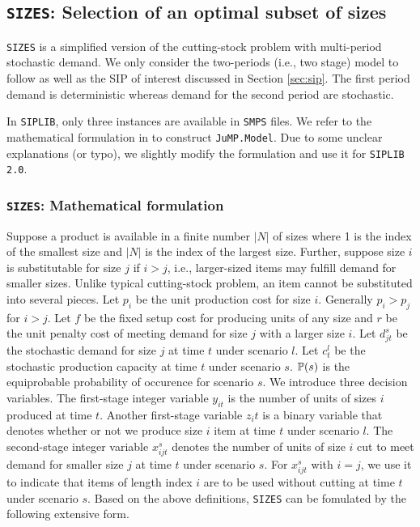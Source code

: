 \subsection{\texttt{SIZES}: Selection of an optimal subset of sizes} \label{SIZES}
\texttt{SIZES} is a simplified version of the cutting-stock problem with multi-period stochastic demand. We only consider the two-periods (i.e., two stage) model to follow \cite{journal:JSW1999} as well as the SIP of interest discussed in Section \ref{sec:sip}. The first period demand is deterministic whereas demand for the second period are stochastic. 

In \texttt{SIPLIB}, only three instances are available in \texttt{SMPS} files. We refer to the mathematical formulation in \cite{journal:JSW1999} to construct \texttt{JuMP.Model}. Due to some unclear explanations (or typo), we slightly modify the formulation and use it for \texttt{SIPLIB 2.0}.

\subsubsection{\texttt{SIZES}: Mathematical formulation}
Suppose a product is available in a finite number $|N|$ of sizes where 1 is the index of the smallest size and $|N|$ is the index of the largest size. Further, suppose size $i$ is substitutable for size $j$ if $i>j$, i.e., larger-sized items may fulfill demand for smaller sizes. Unlike typical cutting-stock problem, an item cannot be substituted into several pieces. 
Let $p_i$ be the unit production cost for size $i$. Generally $p_i>p_j$ for $i>j$. Let $f$ be the fixed setup cost for producing units of any size and $r$ be the unit penalty cost of meeting demand for size $j$ with a larger size $i$. Let $d_{jt}^s$ be the stochastic demand for size $j$ at time $t$ under scenario $l$. Let $c_t^l$ be the stochastic production capacity at time $t$ under scenario $s$. $\operatorname*{\mathbb{P}}(s)$ is the equiprobable probability of occurence for scenario $s$.
We introduce three decision variables. The first-stage integer variable $y_{it}$ is the number of units of sizes $i$ produced at time $t$. Another first-stage variable $z_it$ is a binary variable that denotes whether or not we produce size $i$ item at time $t$ under scenario $l$. The second-stage integer variable $x_{ijt}^s$ denotes the number of units of size $i$ cut to meet demand for smaller size $j$ at time $t$ under scenario $s$. For $x_{ijt}^s$ with $i=j$, we use it to indicate that items of length index $i$ are to be used without cutting at time $t$ under scenario $s$.
Based on the above definitions, \texttt{SIZES} can be fomulated by the following extensive form.

